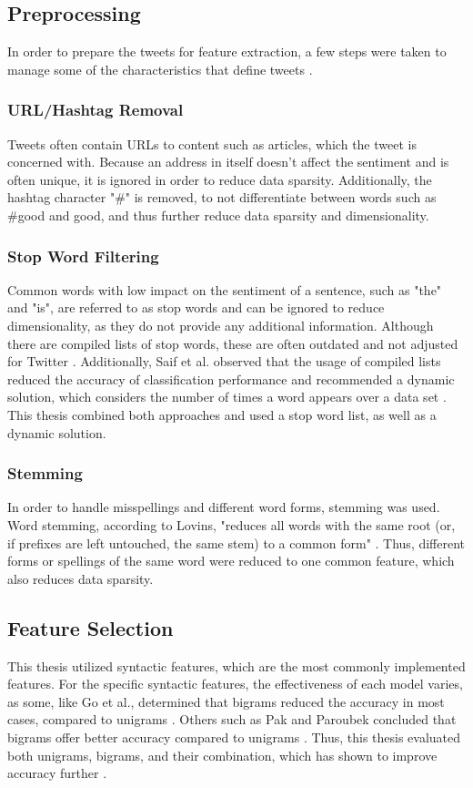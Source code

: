 \subsection{Preprocessing}
In order to prepare the tweets for feature extraction, a few steps were taken to manage some of the characteristics that define tweets \cite{DBLP:journals/csur/GiachanouC16}.

\subsubsection{URL/Hashtag Removal}
Tweets often contain URLs to content such as articles, which the tweet is concerned with. Because an address in itself doesn't affect the sentiment and is often unique, it is ignored in order to reduce data sparsity. Additionally, the hashtag character "\#" is removed, to not differentiate between words such as \#good and good, and thus further reduce data sparsity and dimensionality.

\subsubsection{Stop Word Filtering}
Common words with low impact on the sentiment of a sentence, such as "the" and "is", are referred to as stop words and can be ignored to reduce dimensionality, as they do not provide any additional information. Although there are compiled lists of stop words, these are often outdated and not adjusted for Twitter \cite{DBLP:journals/csur/GiachanouC16}. Additionally, Saif et al. observed that the usage of compiled lists reduced the accuracy of classification performance and recommended a dynamic solution, which considers the number of times a word appears over a data set \cite{data_sparsity}. This thesis combined both approaches and used a stop word list, as well as a dynamic solution.

\subsubsection{Stemming}
In order to handle misspellings and different word forms, stemming was used. Word stemming, according to Lovins, "reduces all words with the same root (or, if prefixes are left
untouched, the same stem) to a common form" \cite[p.~22]{Lovins1968DevelopmentOA}. Thus, different forms or spellings of the same word were reduced to one common feature, which also reduces data sparsity.

\subsection{Feature Selection}
This thesis utilized syntactic features, which are the most commonly implemented features. For the specific syntactic features, the effectiveness of each model varies, as some, like Go et al., determined that bigrams reduced the accuracy in most cases, compared to unigrams \cite{GoBHaHua2009}. Others such as Pak and Paroubek concluded that bigrams offer better accuracy compared to unigrams \cite{pak}. Thus, this thesis evaluated both unigrams, bigrams, and their combination, which has shown to improve accuracy further \cite{GoBHaHua2009}.

